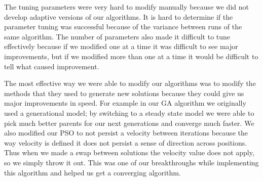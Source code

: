\documentclass[a4paper]{article}
\newcommand{\printbibliography}{}
\begin{document}
The tuning parameters were very hard to modify manually because we did not develop adaptive versions of our algorithms. It is hard to determine if the parameter tuning was successful because of the variance between runs of the same algorithm. The number of parameters also made it difficult to tune effectively because if we modified one at a time it was difficult to see major improvements, but if we modified more than one at a time it would be difficult to tell what caused improvement.

The most effective way we were able to modify our algorithms was to modify the methods that they used to generate new solutions because they could give us major improvements in speed. For example in our GA algorithm we originally used a generational model; by switching to a steady state model we were able to pick much better parents for our next generations and converge much faster. We also modified our PSO to not persist a velocity between iterations because the way velocity is defined it does not persist a sense of direction across positions. Thus when we made a swap between solutions the velocity value does not apply, so we simply throw it out. This was one of our breakthroughs while implementing this algorithm and helped us get a converging algorithm.



\printbibliography






\end{document}
